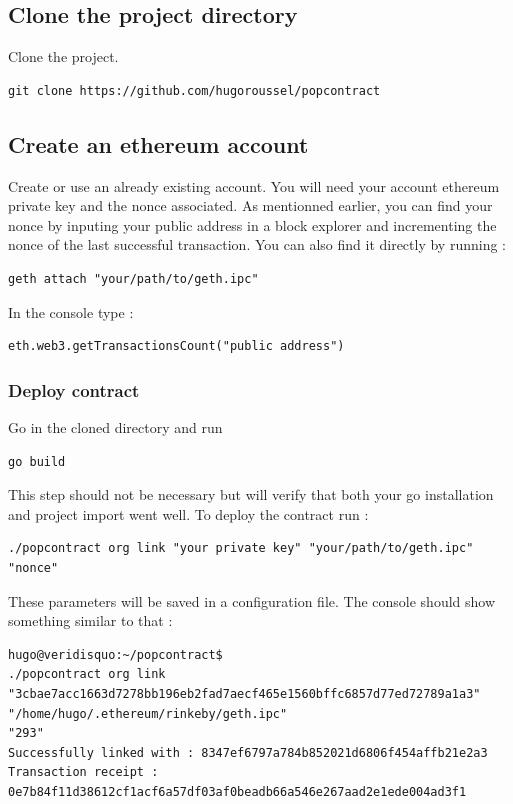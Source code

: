 \documentclass[11pt, a4paper, twoside, openright]{article} %
\begin{document}
\subsection*{Clone the project directory}
Clone the project.
\begin{verbatim}
git clone https://github.com/hugoroussel/popcontract
\end{verbatim}
\subsection*{Create an ethereum account}
Create or use an already existing account. You will need your account ethereum private key and the nonce associated. As mentionned earlier, you can find your nonce by inputing your public address in a block explorer and incrementing the nonce of the last successful transaction. You can also find it directly by running :
\begin{verbatim}
geth attach "your/path/to/geth.ipc"
\end{verbatim}
In the console type :
\begin{verbatim}
eth.web3.getTransactionsCount("public address")
\end{verbatim}
\subsubsection*{Deploy contract}
Go in the cloned directory and run
\begin{verbatim}
go build
\end{verbatim}
This step should not be necessary but will verify that both your go installation and project import went well.
To deploy the contract run :
\begin{verbatim}
./popcontract org link "your private key" "your/path/to/geth.ipc" "nonce"
\end{verbatim}
These parameters will be saved in a configuration file.
The console should show something similar to that :
\begin{verbatim}
hugo@veridisquo:~/popcontract$
./popcontract org link
"3cbae7acc1663d7278bb196eb2fad7aecf465e1560bffc6857d77ed72789a1a3"
"/home/hugo/.ethereum/rinkeby/geth.ipc"
"293"
Successfully linked with : 8347ef6797a784b852021d6806f454affb21e2a3
Transaction receipt :
0e7b84f11d38612cf1acf6a57df03af0beadb66a546e267aad2e1ede004ad3f1
\end{verbatim}
\end{document}
